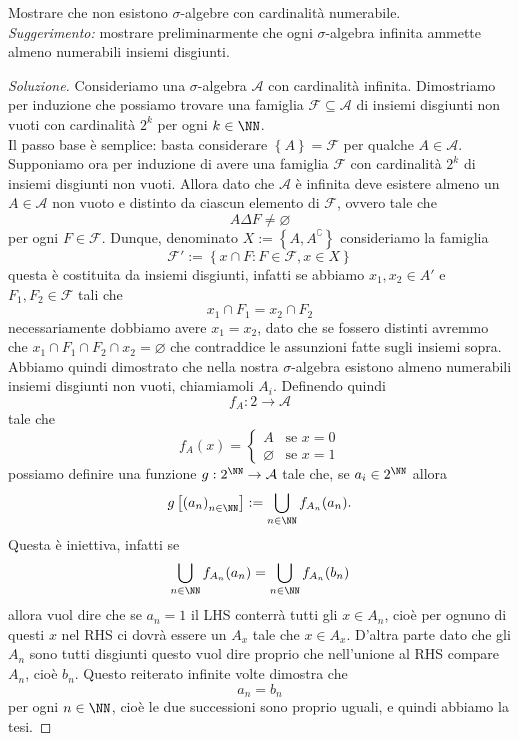 \documentclass[11pt]{scrartcl}
\newcommand{\eset}{\varnothing}
\begin{document}
	\begin{exercise}
		Mostrare che non esistono $\sigma$-algebre con cardinalità numerabile. \\
		\textit{Suggerimento:} mostrare preliminarmente che ogni $\sigma$-algebra infinita ammette almeno numerabili
		insiemi disgiunti.
	\end{exercise}
	\begin{proof}[Soluzione]
		Consideriamo una $\sigma$-algebra $\mathcal{A}$ con cardinalità infinita. Dimostriamo per induzione che possiamo trovare una famiglia $\mathcal{F}\subseteq \mathcal{A}$ di insiemi disgiunti non vuoti con cardinalità $2^k$ per ogni $k\in\NN$. \\
		Il passo base è semplice: basta considerare $\left\{A\right\}=\mathcal{F}$ per qualche $A\in \mathcal{A}$. Supponiamo ora per induzione di avere una famiglia $\mathcal{F}$ con cardinalità $2^k$ di insiemi disgiunti non vuoti. Allora dato che $\mathcal{A}$ è infinita deve esistere almeno un $A\in \mathcal{A}$ non vuoto e distinto da ciascun elemento di $\mathcal{F}$, ovvero tale che
		$$A\Delta F \ne \eset$$
		per ogni $F\in \mathcal{F}$. Dunque, denominato $X:=\left\{A,A^\complement\right\}$ consideriamo la famiglia
		$$\mathcal{F}':=\left\{x\cap F:F\in \mathcal{F},x\in X\right\}$$
		questa è costituita da insiemi disgiunti, infatti se abbiamo $x_1,x_2\in A'$ e $F_1,F_2\in \mathcal{F}$ tali che
		$$x_1\cap F_1=x_2\cap F_2$$
		necessariamente dobbiamo avere $x_1=x_2$, dato che se fossero distinti avremmo che $x_1\cap F_1\cap F_2\cap x_2=\eset$ che contraddice le assunzioni fatte sugli insiemi sopra. \\
		Abbiamo quindi dimostrato che nella nostra $\sigma$-algebra esistono almeno numerabili insiemi disgiunti non vuoti, chiamiamoli $A_i$. Definendo quindi
		$$f_A:2\to \mathcal{A}$$
		tale che
		$$f_A(x)=\begin{cases}
			A & \text{se $x=0$} \\
			\eset & \text{se $x=1$}
		\end{cases}$$
		possiamo definire una funzione $g:2^\NN\to \mathcal{A}$ tale che, se $a_i\in 2^\NN$ allora
		$$g\left[\left(a_n\right)_{n\in\NN}\right]:=\bigcup_{n\in\NN}f_{A_n}(a_n).$$
		Questa è iniettiva, infatti se 
		$$\bigcup_{n\in\NN}f_{A_n}(a_n)=\bigcup_{n\in\NN}f_{A_n}(b_n)$$
		allora vuol dire che se $a_n=1$ il LHS conterrà tutti gli $x\in A_n$, cioè per ognuno di questi $x$ nel RHS ci dovrà essere un $A_x$ tale che $x\in A_x$. D'altra parte dato che gli $A_n$ sono tutti disgiunti questo vuol dire proprio che nell'unione al RHS compare $A_n$, cioè $b_n$. Questo reiterato infinite volte dimostra che 
		$$a_n=b_n$$
		per ogni $n\in\NN$, cioè le due successioni sono proprio uguali, e quindi abbiamo la tesi. 
	\end{proof}
	
\end{document}
